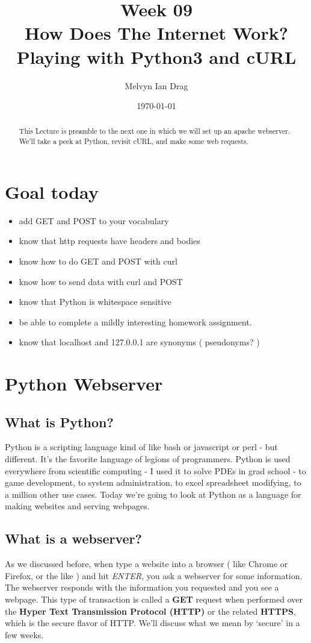 \documentclass[10pt]{article}
\title{\textbf{Week 09} \\
\Large How Does The Internet Work? Playing with Python3 and cURL}
\author{
	Melvyn Ian Drag
}
\date{\today}
\begin{document}
\maketitle

\begin{abstract}
This Lecture is preamble to the next one in which we will set up an apache webserver. We'll take a peek at Python, revisit cURL, and make some web requests.
\end{abstract}

\section{Goal today}
\begin{itemize}
\item add GET and POST to your vocabulary
\item know that http requests have headers and bodies
\item know how to do GET and POST with curl
\item know how to send data with curl and POST
\item know that Python is whitespace sensitive
\item be able to complete a mildly interesting homework assignment. 
\item know that localhost and 127.0.0.1 are synonyms ( pseudonyms? )
\end{itemize}

\section{Python Webserver}
\subsection{What is Python?}
Python is a scripting language kind of like bash or javascript or perl - but different. It's the favorite language of legions of programmers. Python is used everywhere from scientific computing - I used it to solve PDEs in grad school - to game development, to system administration, to excel spreadsheet modifying, to a million other use cases. Today we're going to look at Python as a language for making websites and serving webpages.

\subsection{What is a webserver?}
As we discussed before, when type a website into a browser ( like Chrome or Firefox, or the like ) and hit \textit{ENTER}, you ask a webserver for some information. The webserver responds with the information you requested and you see a webpage. This type of transaction is called a \textbf{GET} request when performed over the \textbf{Hyper Text Transmission Protocol (HTTP)} or the related \textbf{HTTPS}, which is the secure flavor of HTTP. We'll discuss what we mean by `secure' in a few weeks. 
\end{document}
